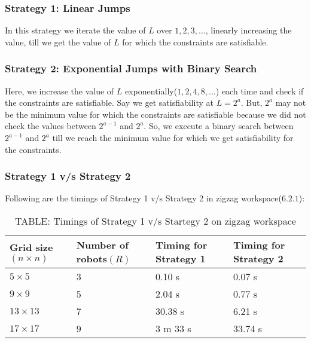 \documentclass{article}[11pt]
\begin{document}
			\subsubsection{Strategy 1: Linear Jumps}
			In this strategy we iterate the value of $L$ over $1, 2, 3, ...$, linearly increasing the value, till we get the value of $L$ for which the constraints are satisfiable.\\
			
			\subsubsection{Strategy 2: Exponential Jumps with Binary Search}
			Here, we increase the value of $L$ exponentially($1, 2, 4, 8, ...$) each time and check if the constraints are satisfiable. Say we get satisfiability at $L = 2^a$. But, $2^a$ may not be the minimum value for which the constraints are satisfiable because we did not check the values between $2^{a-1}$ and $2^a$. So, we execute a binary search between $2^{a-1}$ and $2^a$ till we reach the minimum value for which we get satisfiability for the constraints.

			\subsubsection{Strategy 1 v/s Strategy 2}
			Following are the timings of Strategy 1 v/s Strategy 2 in zigzag workspace($6.2.1$):
				\begin{table}[h!]
				\centering
				\begin{tabular}{|| p{2cm} | p{2cm} | p{2cm} | p{2cm} ||} 
				 \hline\hline
				 Grid size$(n \times n)$ & Number of robots$(R)$ & Timing for Strategy 1 & Timing for Strategy 2 \\ [0.5ex] 
				 \hline\hline
				 $5 \times 5$ & 3 & 0.10 s & 0.07 s \\ 
				 $9 \times 9$ & 5 & 2.04 s & 0.77 s \\
				 $13 \times 13$ & 7 & 30.38 s & 6.21 s \\
				 $17 \times 17$ & 9 & 3 m 33 s & 33.74 s  \\ [1ex]
				 \hline
				\end{tabular}
				\caption*{TABLE: Timings of Strategy 1 v/s Startegy 2 on zigzag workspace}
				\end{table}
\end{document}
